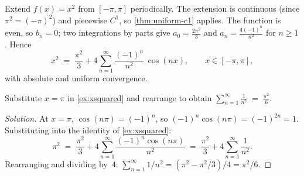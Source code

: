 \begin{example}
\label{ex:xsquared}
Extend $f(x) = x^2$ from $[-\pi, \pi]$ periodically. The extension is
continuous (since $\pi^2 = (-\pi)^2$) and piecewise $C^1$, so
\cref{thm:uniform-c1} applies. The function is even, so $b_n = 0$;
two integrations by parts give
$a_0 = \frac{2\pi^2}{3}$ and
$a_n = \frac{4 (-1)^n}{n^2}$ for $n \ge 1$. Hence
\[
  x^2 \;=\; \frac{\pi^2}{3} + 4 \sum_{n=1}^{\infty} \frac{(-1)^n}{n^2}\, \cos(nx),
  \qquad x \in [-\pi, \pi],
\]
with absolute and uniform convergence.
\end{example}

\begin{problem}
\label{prob:basel}
Substitute $x = \pi$ in \cref{ex:xsquared} and rearrange to obtain
$\displaystyle \sum_{n=1}^{\infty} \frac{1}{n^2} \;=\; \frac{\pi^2}{6}$.
\end{problem}

\begin{proof}[Solution]
At $x = \pi$, $\cos(n\pi) = (-1)^n$, so
$(-1)^n \cos(n\pi) = (-1)^{2n} = 1$. Substituting into the identity
of \cref{ex:xsquared}:
\[
  \pi^2 \;=\; \frac{\pi^2}{3} + 4 \sum_{n=1}^{\infty} \frac{(-1)^n \cos(n\pi)}{n^2}
       \;=\; \frac{\pi^2}{3} + 4 \sum_{n=1}^{\infty} \frac{1}{n^2}.
\]
Rearranging and dividing by~$4$:
$\sum_{n=1}^{\infty} 1/n^2 = (\pi^2 - \pi^2/3)/4 = \pi^2/6$.
\end{proof}
